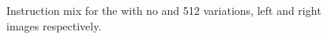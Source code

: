 \begin{figure}[!htp]
	\begin{center}
		\caption{Instruction mix for the \ttDilepKinFit with no and 512 variations, left and right images respectively.}
		\label{fig:InstMix}
	\end{center}
\end{figure}

